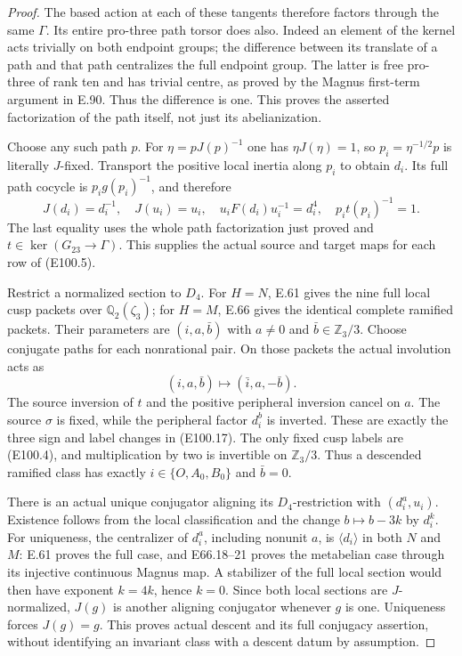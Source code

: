 \begin{proof}
The based action at each of these tangents
therefore factors through the same $\Gamma$.
Its entire pro-three path torsor does also.
Indeed an element of the kernel acts trivially
on both endpoint groups; the difference between
its translate of a path and that path centralizes
the full endpoint group. The latter is free
pro-three of rank ten and has trivial centre,
as proved by the Magnus first-term argument
in E.90. Thus the difference is one.
This proves the asserted factorization of the
path itself, not just its abelianization.

Choose any such path $p$. For
$\eta=pJ(p)^{-1}$ one has
$\eta J(\eta)=1$, so
$p_i=\eta^{-1/2}p$ is literally $J$-fixed.
Transport the positive local inertia along
$p_i$ to obtain $d_i$. Its full path cocycle
is $p_i g(p_i)^{-1}$, and therefore
\[
 J(d_i)=d_i^{-1},\quad J(u_i)=u_i,\quad
 u_iF(d_i)u_i^{-1}=d_i^4,\quad
 p_i t(p_i)^{-1}=1 .
 \tag{E100.16}
\]
The last equality uses the whole path
factorization just proved and $t\in\ker(G_{23}\to\Gamma)$.
This supplies the actual source and target
maps for each row of (E100.5).

Restrict a normalized section to $D_4$.
For $H=N$, E.61 gives the nine full local
cusp packets over $\mathbb Q_2(\zeta_3)$;
for $H=M$, E.66 gives the identical complete
ramified packets. Their parameters are
$(i,a,\bar b)$ with $a\ne0$ and
$\bar b\in\mathbb Z_3/3$. Choose conjugate
paths for each nonrational pair. On those
packets the actual involution acts as
\[
                 (i,a,\bar b)\longmapsto
                         (\bar i,a,-\bar b).
 \tag{E100.17}
\]
The source inversion of $t$ and the positive
peripheral inversion cancel on $a$.
The source $\sigma$ is fixed, while the
peripheral factor $d_i^b$ is inverted.
These are exactly the three sign and label
changes in (E100.17). The only fixed cusp
labels are (E100.4), and multiplication by
two is invertible on $\mathbb Z_3/3$.
Thus a descended ramified class has
exactly $i\in\{O,A_0,B_0\}$ and $\bar b=0$.

There is an actual unique conjugator
aligning its $D_4$-restriction with
$(d_i^a,u_i)$. Existence follows from
the local classification and the change
$b\mapsto b-3k$ by $d_i^k$.
For uniqueness, the centralizer of
$d_i^a$, including nonunit $a$, is
$\langle d_i\rangle$ in both $N$ and $M$:
E.61 proves the full case, and E66.18--21
proves the metabelian case through its
injective continuous Magnus map.
A stabilizer of the full local section
would then have exponent $k=4k$, hence
$k=0$. Since both local sections are
$J$-normalized, $J(g)$ is another aligning
conjugator whenever $g$ is one. Uniqueness
forces $J(g)=g$. This proves actual descent
and its full conjugacy assertion, without
identifying an invariant class with a
descent datum by assumption.


\end{proof}
